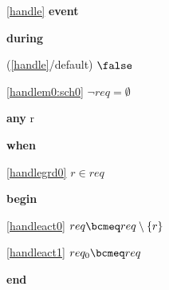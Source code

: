 \noindent \ref{handle}  \textbf{event}
\begin{block}
  \item   \textbf{during}
  \begin{block}
  \item[ (\ref{handle}/default) ]\sout{$\false$} %
  \end{block}
  \begin{block}
  \item[ \eqref{handlem0:sch0} ]{$\neg req = \emptyset$} %
  \end{block}
  \item   \textbf{any} r
  \item   \textbf{when}
  \begin{block}
  \item[ \eqref{handlegrd0} ]{$r \in req$} %
  \end{block}
  \item   \textbf{begin}
  \begin{block}
  \item[ \eqref{handleact0} ]{$req \bcmeq req \setminus \{ r \}$} %
  \item[ \eqref{handleact1} ]{$req_0 \bcmeq req$} %
  \end{block}
  \item   \textbf{end} \\
\end{block}
